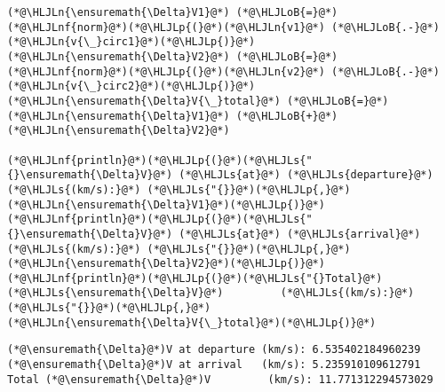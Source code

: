 \documentclass[12pt,a4paper]{article}
\newcommand{\HLJLn}[1]{#1}
\newcommand{\HLJLnf}[1]{\textcolor[RGB]{66,102,213}{#1}}
\newcommand{\HLJLs}[1]{\textcolor[RGB]{201,61,57}{#1}}
\newcommand{\HLJLoB}[1]{\textcolor[RGB]{102,102,102}{\textbf{#1}}}
\newcommand{\HLJLp}[1]{#1}
\begin{document}
\begin{lstlisting}
(*@\HLJLn{\ensuremath{\Delta}V1}@*) (*@\HLJLoB{=}@*) (*@\HLJLnf{norm}@*)(*@\HLJLp{(}@*)(*@\HLJLn{v1}@*) (*@\HLJLoB{.-}@*) (*@\HLJLn{v{\_}circ1}@*)(*@\HLJLp{)}@*)
(*@\HLJLn{\ensuremath{\Delta}V2}@*) (*@\HLJLoB{=}@*) (*@\HLJLnf{norm}@*)(*@\HLJLp{(}@*)(*@\HLJLn{v2}@*) (*@\HLJLoB{.-}@*) (*@\HLJLn{v{\_}circ2}@*)(*@\HLJLp{)}@*)
(*@\HLJLn{\ensuremath{\Delta}V{\_}total}@*) (*@\HLJLoB{=}@*) (*@\HLJLn{\ensuremath{\Delta}V1}@*) (*@\HLJLoB{+}@*) (*@\HLJLn{\ensuremath{\Delta}V2}@*)

(*@\HLJLnf{println}@*)(*@\HLJLp{(}@*)(*@\HLJLs{"{}\ensuremath{\Delta}V}@*) (*@\HLJLs{at}@*) (*@\HLJLs{departure}@*) (*@\HLJLs{(km/s):}@*) (*@\HLJLs{"{}}@*)(*@\HLJLp{,}@*) (*@\HLJLn{\ensuremath{\Delta}V1}@*)(*@\HLJLp{)}@*)
(*@\HLJLnf{println}@*)(*@\HLJLp{(}@*)(*@\HLJLs{"{}\ensuremath{\Delta}V}@*) (*@\HLJLs{at}@*) (*@\HLJLs{arrival}@*)   (*@\HLJLs{(km/s):}@*) (*@\HLJLs{"{}}@*)(*@\HLJLp{,}@*) (*@\HLJLn{\ensuremath{\Delta}V2}@*)(*@\HLJLp{)}@*)
(*@\HLJLnf{println}@*)(*@\HLJLp{(}@*)(*@\HLJLs{"{}Total}@*) (*@\HLJLs{\ensuremath{\Delta}V}@*)         (*@\HLJLs{(km/s):}@*) (*@\HLJLs{"{}}@*)(*@\HLJLp{,}@*) (*@\HLJLn{\ensuremath{\Delta}V{\_}total}@*)(*@\HLJLp{)}@*)
\end{lstlisting}

\begin{lstlisting}
(*@\ensuremath{\Delta}@*)V at departure (km/s): 6.535402184960239
(*@\ensuremath{\Delta}@*)V at arrival   (km/s): 5.235910109612791
Total (*@\ensuremath{\Delta}@*)V         (km/s): 11.771312294573029
\end{lstlisting}
\end{document}
